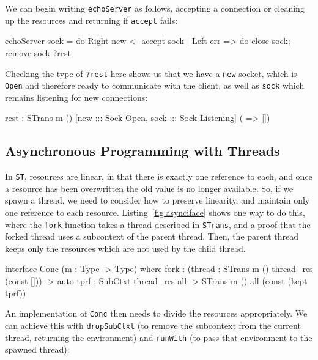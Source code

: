 We can begin writing \texttt{echoServer} as follows, accepting a connection
or cleaning up the resources and returning if \texttt{accept} fails:

\small
\begin{code}
echoServer sock = 
  do Right new <- accept sock | Left err => do close sock; remove sock
     ?rest
\end{code}
\normalsize

Checking the type of \texttt{?rest} here shows us that we have a 
\texttt{new} socket, which is \texttt{Open} and therefore ready to communicate
with the client, as well as \texttt{sock} which remains listening for new
connections:

\small
\begin{code}
rest : STrans m () [new ::: Sock Open, sock ::: Sock Listening]
                   ( => [])
\end{code}
\normalsize

\subsection{Asynchronous Programming with Threads}

\label{sect:async}

In \texttt{ST}, resources are linear, in that there is exactly one reference
to each, and once a resource has been overwritten the old value is no longer
available. So, if we spawn a thread, we need to consider how to preserve
linearity, and maintain only one reference to each resource.
Listing~\ref{fig:asynciface} shows one way to do this, where the
\texttt{fork} function takes a thread described in \texttt{STrans}, and
a proof that the forked thread uses a subcontext of the parent thread.
Then, the parent thread keeps only the resources which are not used by
the child thread.

\small
\begin{code}[float=h, frame=single,caption={An interface supporting
asynchronous programming, dividing resources between a child
and a parent thread},
label=fig:asynciface]
interface Conc (m : Type -> Type) where
  fork : (thread : STrans m () thread_res (const [])) ->
         {auto tprf : SubCtxt thread_res all} ->
         STrans m () all (const (kept tprf)) 
\end{code}
\normalsize

An implementation of \texttt{Conc} then needs to divide the resources
appropriately. We can achieve this with \texttt{dropSubCtxt} (to remove
the subcontext from the current thread, returning the environment) and
\texttt{runWith} (to pass that environment to the spawned thread):

